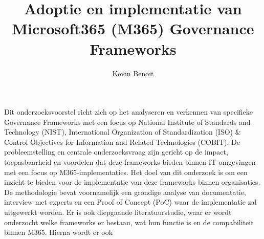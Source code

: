 \documentclass{hogent-article}
\title{Adoptie en implementatie van Microsoft365 (M365) Governance Frameworks}
\author{Kevin Benoit}
\begin{document}
Dit onderzoeksvoorstel richt zich op het analyseren en verkennen van specifieke Governance Frameworks met een focus op National Institute of Standards and Technology (NIST), International Organization of Standardization (ISO) & Control Objectives for Information and Related Technologies (COBIT). De probleemstelling en centrale onderzoeksvraag zijn gericht op de impact, toepasbaarheid en voordelen dat deze frameworks bieden binnen IT-omgevingen met een focus op M365-implementaties. Het doel van dit onderzoek is om een inzicht te bieden voor de implementatie van deze frameworks binnen organisaties. De methodologie bevat voornamelijk een grondige analyse van documentatie, interview met experts en een Proof of Concept (PoC) waar de implementatie zal uitgewerkt worden. Er is ook diepgaande literatuurstudie, waar er wordt onderzocht welke frameworks er bestaan, wat hun functie is en de compabiliteit binnen M365. Hierna wordt er ook 
\begin{abstract}

\end{abstract}

\tableofcontents



\printbibliography[heading=bibintoc]
\end{document}
